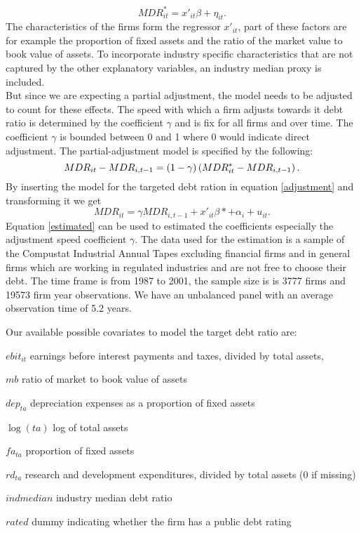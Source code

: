 \documentclass[document.tex]{subfiles}
\begin{document}
\begin{equation}
MDR^*_{it} = x'_{it} \beta + \eta_{it}.
\end{equation}
The characteristics of the firms form the regressor $x'_{it}$, part of these factors are for example 
the proportion of fixed assets and the ratio of the market value to book value of assets.  
To incorporate industry specific characteristics that are not captured by the other explanatory variables, an industry median proxy is included.\\
But since we are expecting a partial adjustment, the model needs to be adjusted to count for these effects. The speed with which a firm adjusts towards it debt ratio is determined by the coefficient $\gamma$ and is fix for all firms and over time. The coefficient $\gamma$ is bounded between 0 and 1 where 0 would indicate direct adjustment. The partial-adjustment model is specified by the following:
\begin{equation}
MDR_{it} - MDR_{i,t-1} = (1-\gamma) \left( MDR^*_{it} - MDR_{i,t-1} \right) \label{adjustment}. 
\end{equation}
By inserting the model for the targeted debt ration in equation \eqref{adjustment} and transforming it we get
\begin{equation}
MDR_{it}= \gamma MDR_{i,t-1} + x'_{it} \beta* + \alpha_i + u_{it}. \label{estimated}
\end{equation}
Equation \eqref{estimated} can be used to estimated the coefficients especially the adjustment speed coefficient $\gamma$.
The data used for the estimation is a sample of the Compustat Industrial Annual Tapes excluding financial firms and in general firms which are working in regulated industries and are not free to choose their debt. The time frame is from 1987 to 2001, the sample size is is 3777 firms and 19573 firm year observations. We have an unbalanced panel with an average observation time of 5.2 years. 

\newpage

Our available possible covariates to model the target debt ratio are:
\\
\begin{compactenum}
\item $ebit_{it}$  earnings before interest payments and taxes, divided by total assets, 
\item  $mb$ ratio of market to book value of assets 
\item $dep_{ta}$ depreciation expenses as a proportion of fixed assets 
\item $\log (ta) $ log of total assets 
\item $fa_{ta}$ proportion of fixed assets
\item $rd_{ta}$ research and development expenditures, divided by total assets (0 if missing)
\item $indmedian$ industry median debt ratio
\item $rated$ dummy indicating whether the firm has a public debt rating
\end{compactenum}
\end{document}

